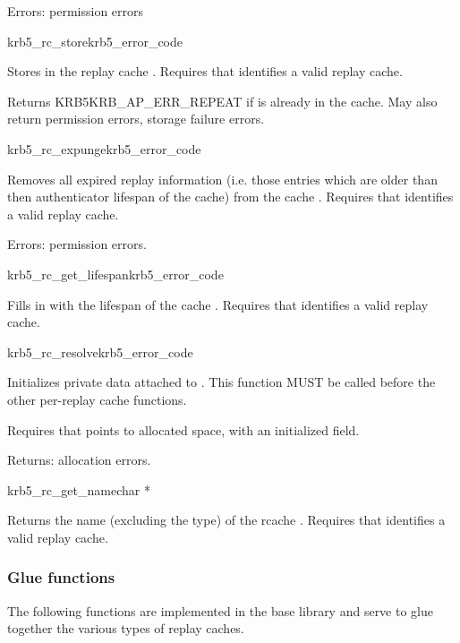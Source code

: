 Errors: permission errors

\begin{funcdecl}{krb5_rc_store}{krb5_error_code}{\funcin}
\end{funcdecl}
Stores  in the replay cache .
Requires that  identifies a valid replay cache.

Returns KRB5KRB_AP_ERR_REPEAT if  is already in the
cache.  May also return permission errors, storage failure errors.

\begin{funcdecl}{krb5_rc_expunge}{krb5_error_code}{\funcin}
\end{funcdecl}
Removes all expired replay information (i.e. those entries which are
older than then authenticator lifespan of the cache) from the cache
.  Requires that  identifies a valid replay
cache.

Errors: permission errors.

\begin{funcdecl}{krb5_rc_get_lifespan}{krb5_error_code}{\funcin}
\funcout
{}
\end{funcdecl}
Fills in  with the lifespan of
the cache .
Requires that  identifies a valid replay cache.

\begin{funcdecl}{krb5_rc_resolve}{krb5_error_code}{\funcinout}
\funcin
{}
\end{funcdecl}

Initializes private data attached to .  This function MUST
be called before the other per-replay cache functions.

Requires that  points to allocated space, with an
initialized  field.

Returns:  allocation errors.


\begin{funcdecl}{krb5_rc_get_name}{char *}{\funcin}
\end{funcdecl}

Returns the name (excluding the type) of the rcache .
Requires that  identifies a valid replay cache.

\subsubsection{Glue functions}
The following functions are implemented in the base library and serve to
glue together the various types of replay caches.

